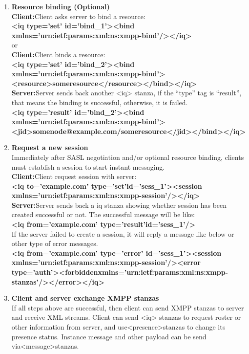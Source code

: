 \documentclass{SureshLimkar}
\begin{document}
\begin{enumerate}
\item \textbf{Resource binding (Optional)}
\\
\textbf{Client:}Client asks server to bind a resource:
\\
\textbf{<iq type='set' id='bind_1'><bind xmlns='urn:ietf:params:xml:ns:xmpp-bind'/></iq>}
\\
or
\\
\textbf{Client:}Client binds a resource:
\\
\textbf{<iq type='set' id='bind_2'><bind xmlns='urn:ietf:params:xml:ns:xmpp-bind'><resource>someresource</resource></bind></iq>}
\\
\textbf{Server:}Server sends back another <iq> stanza, if the “type” tag is “result”, that means the binding is successful, otherwise, it is failed.
\\
\textbf{<iq type='result' id='bind_2'><bind xmlns='urn:ietf:params:xml:ns:xmpp-bind'><jid>somenode@example.com/someresource</jid></bind></iq>}
\\
\item \textbf{Request a new session}
\\Immediately after SASL negotiation and/or optional resource binding, clients must establish a session to start instant messaging.
\\
\textbf{Client:}Client request session with server:
\\
\textbf{<iq to='example.com' type='set'id='sess_1'><session xmlns='urn:ietf:params:xml:ns:xmpp-session'/></iq>}
\\
\textbf{Server:}Server sends back a iq stanza showing whether session has been created successful or not.
The successful message will be like:
\\
\textbf{<iq from='example.com' type='result'id='sess_1'/>}
\\
If the server failed to create a session, it will reply a message like below or other type of error messages.
\\
\textbf{<iq from='example.com' type='error' id='sess_1'><session xmlns='urn:ietf:params:xml:ns:xmpp-session'/><error type='auth'><forbiddenxmlns='urn:ietf:params:xml:ns:xmpp-stanzas'/></error></iq>}
\\

\item \textbf{Client and server exchange XMPP stanzas}\\
If all steps above are successful, then client can send XMPP stanzas to server and receive XML streams. Client can send <iq> stanzas to request roster or other information from server, and use<presence>stanzas to change its presence status. Instance message and other payload can be send via<message>stanzas.


\end{enumerate}
\end{document}
